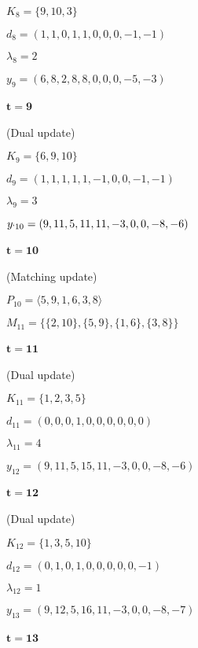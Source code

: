 \documentclass[a4paper,10pt, leqno]{article}
\theoremstyle{definition}
\begin{document}
$K_8 = \{ 9, 10, 3 \}$

$d_8 = (1, 1, 0, 1, 1, 0, 0, 0, -1, -1)$

$\lambda_8 = 2$

$y_9 = (6, 8, 2, 8, 8, 0, 0, 0, -5, -3)$

\paragraph{$\mathbf{t = 9}$}

(Dual update)

$K_9 = \{ 6, 9, 10 \}$

$d_9 = (1, 1, 1, 1, 1, -1, 0, 0, -1, -1)$

$\lambda_9 = 3$

$y_{`10} = (9, 11, 5, 11, 11, -3, 0, 0, -8, -6)$

\paragraph{$\mathbf{t = 10}$}

(Matching update)

$P_{10} = \langle 5, 9, 1, 6, 3, 8 \rangle$ 

$M_{11} = \{\{2, 10\}, \{ 5, 9 \}, \{1, 6 \}, \{ 3, 8 \}\}$ 

\paragraph{$\mathbf{t = 11}$}

(Dual update)

$K_{11} = \{ 1, 2, 3, 5 \}$

$d_{11} = (0, 0, 0, 1, 0, 0, 0, 0, 0, 0)$

$\lambda_{11} = 4$

$y_{12} = (9, 11, 5, 15, 11, -3, 0, 0, -8, -6)$

\paragraph{$\mathbf{t = 12}$}

(Dual update)

$K_{12} = \{ 1, 3, 5, 10 \}$

$d_{12} = (0, 1, 0, 1, 0, 0, 0, 0, 0, -1)$

$\lambda_{12} = 1$

$y_{13} = (9, 12, 5, 16, 11, -3, 0, 0, -8, -7)$

\paragraph{$\mathbf{t = 13}$}
\end{document}
